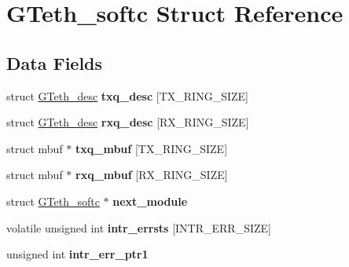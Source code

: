 \hypertarget{structGTeth__softc}{}\section{G\+Teth\+\_\+softc Struct Reference}
\label{structGTeth__softc}
\subsection*{Data Fields}
\begin{DoxyCompactItemize}
\item 
\mbox{\label{structGTeth__softc_a72ab4571bf03a4c1f99b7890fc54380f}} 
struct \mbox{\hyperlink{structGTeth__desc}{G\+Teth\+\_\+desc}} {\bfseries txq\+\_\+desc} \mbox{[}T\+X\+\_\+\+R\+I\+N\+G\+\_\+\+S\+I\+ZE\mbox{]}
\item 
\mbox{\label{structGTeth__softc_ad4ad7830e06da8ddd2f262cae2cadb4c}} 
struct \mbox{\hyperlink{structGTeth__desc}{G\+Teth\+\_\+desc}} {\bfseries rxq\+\_\+desc} \mbox{[}R\+X\+\_\+\+R\+I\+N\+G\+\_\+\+S\+I\+ZE\mbox{]}
\item 
\mbox{\label{structGTeth__softc_acbf4d4c63c01a0199f421a4b626703c8}} 
struct mbuf $\ast$ {\bfseries txq\+\_\+mbuf} \mbox{[}T\+X\+\_\+\+R\+I\+N\+G\+\_\+\+S\+I\+ZE\mbox{]}
\item 
\mbox{\label{structGTeth__softc_a0bf13f607decc8e933234e1cfc35a08a}} 
struct mbuf $\ast$ {\bfseries rxq\+\_\+mbuf} \mbox{[}R\+X\+\_\+\+R\+I\+N\+G\+\_\+\+S\+I\+ZE\mbox{]}
\item 
\mbox{\label{structGTeth__softc_a402816c6498969f11d9c7b9012383e5a}} 
struct \mbox{\hyperlink{structGTeth__softc}{G\+Teth\+\_\+softc}} $\ast$ {\bfseries next\+\_\+module}
\item 
\mbox{\label{structGTeth__softc_a7e328b5d09825736abc4b12a884a77b8}} 
volatile unsigned int {\bfseries intr\+\_\+errsts} \mbox{[}I\+N\+T\+R\+\_\+\+E\+R\+R\+\_\+\+S\+I\+ZE\mbox{]}
\item 
\mbox{\label{structGTeth__softc_ae93226548024cc82e1d50334cfbdac25}} 
unsigned int {\bfseries intr\+\_\+err\+\_\+ptr1}
\item 

\end{DoxyCompactItemize}
